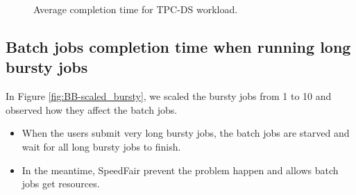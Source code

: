 \begin{figure}[!t]
	\centering
	\caption{Average completion time for TPC-DS workload.}
	\label{fig:TPC-DS-compl_time}
\end{figure}

\subsection{Batch jobs completion time when running long bursty jobs}

In Figure \ref{fig:BB-scaled_bursty}, we scaled the bursty jobs from 1 to 10 and observed how they affect the batch jobs.

\begin{itemize}
\item When the users submit very long bursty jobs, the batch jobs are starved and wait for all long bursty jobs to finish.
\item In the meantime, SpeedFair prevent the problem happen and allows batch jobs get resources.
\end{itemize}

